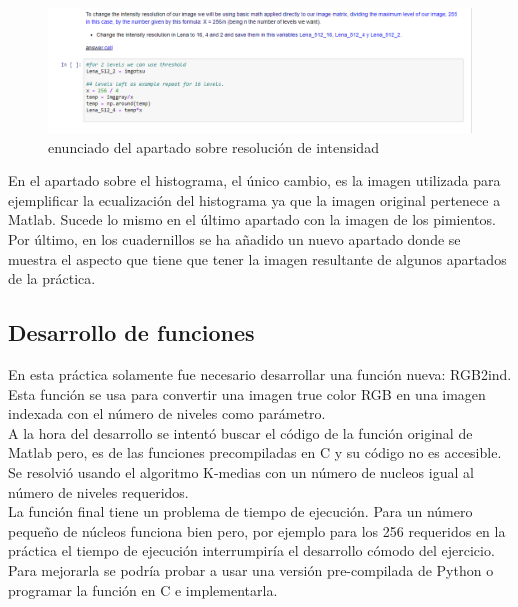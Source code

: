 \documentclass[a4paper,12pt]{report}
\begin{document}
\begin{figure}[h]
\centering
\includegraphics[width=1\textwidth]{imagenes/resolucionmatematica}
\caption{enunciado del apartado sobre resolución de intensidad}
\label{resmatematica}
\end{figure}

En el apartado sobre el histograma, el único cambio, es la imagen utilizada para ejemplificar la ecualización del histograma ya que la imagen original pertenece a Matlab. Sucede lo mismo en el último apartado con la imagen de los pimientos.\\

Por último, en los cuadernillos se ha añadido un nuevo apartado donde se muestra el aspecto que tiene que tener la imagen resultante de algunos apartados de la práctica.

\subsection{Desarrollo de funciones}

En esta práctica solamente fue necesario desarrollar una función nueva: RGB2ind. Esta función se usa para convertir una imagen true color RGB en una imagen indexada con el número de niveles como parámetro. \\

A la hora del desarrollo se intentó buscar el código de la función original de Matlab pero, es de las funciones precompiladas en C y su código no es accesible. Se resolvió usando el algoritmo K-medias con un número de nucleos igual al número de niveles requeridos.\\

 La función final tiene un problema de tiempo de ejecución. Para un número pequeño de núcleos funciona bien pero, por ejemplo para los 256 requeridos en la práctica el tiempo de ejecución interrumpiría el desarrollo cómodo del ejercicio. Para mejorarla se podría probar a usar una versión pre-compilada de Python o programar la función en C e implementarla.\\
\end{document}
